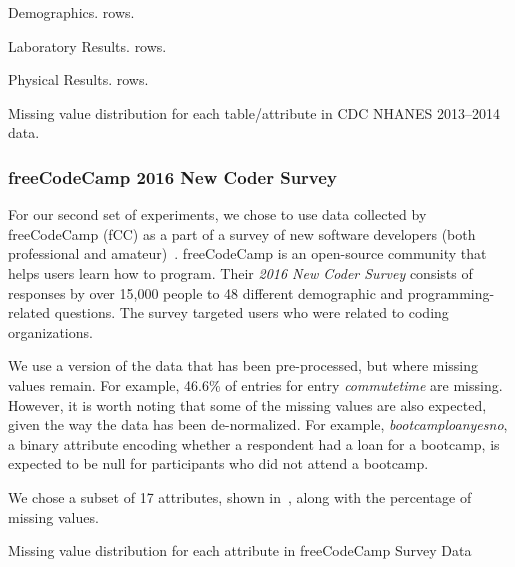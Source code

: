 \begin{table}
  \centering
  \begin{subtable}{0.5\textwidth}
    \centering
    
    \caption{Demographics. \demorows{} rows.}
  \end{subtable}
  \par\medskip
  \begin{subtable}{0.5\textwidth}
    \centering
    
    \caption{Laboratory Results. \labexrows{} rows.}
  \end{subtable}
  \par\medskip  
  \begin{subtable}{0.5\textwidth}
    \centering
    
    \caption{Physical Results. \labexrows{} rows.}
  \end{subtable}
  \par\medskip  
  \caption{Missing value distribution for each table/attribute in CDC NHANES 2013--2014 data.}\label{table:nhanes-description} 
\end{table}

\subsubsection{freeCodeCamp 2016 New Coder Survey}
For our second set of experiments, we chose to use data collected
by freeCodeCamp (fCC) as a part of a survey of new software developers
(both professional and amateur)~\cite{fcc-data}. freeCodeCamp is an open-source
community that helps users learn how to program. Their \textit{2016 New Coder Survey} consists of responses by over 15,000 people to 48 different
demographic and programming-related questions.
The survey targeted users who were related to coding organizations.

We use a version of the data that has been pre-processed, but where missing values remain.
For example, 46.6\% of entries for entry \textit{commutetime} are missing. However, it is worth noting that some of the missing values
are also expected, given the way the data has been de-normalized. For example, \textit{bootcamploanyesno}, a binary attribute encoding
whether a respondent had a loan for a bootcamp, is expected to be null for participants who did not attend a bootcamp.

We chose a subset of 17 attributes, shown in~, along with the percentage of missing values.

\begin{table}
  \centering
  
  \caption{Missing value distribution for each attribute in freeCodeCamp Survey Data}\label{table:fcc-description} 
\end{table}

